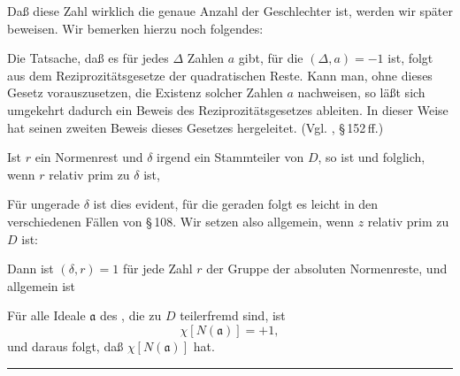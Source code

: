 Daß diese Zahl wirklich die genaue Anzahl der Geschlechter ist, werden wir später beweisen. Wir bemerken hierzu noch folgendes:

Die Tatsache, daß es für jedes $\Delta$ Zahlen $a$ gibt, für die $(\Delta, a) = -1$ ist, folgt aus dem Reziprozitätsgesetze der quadratischen Reste. Kann man, ohne dieses Gesetz vorauszusetzen, die Existenz solcher Zahlen $a$ nachweisen, so läßt sich umgekehrt dadurch ein Beweis des Reziprozitätsgesetzes ableiten. In dieser Weise hat  seinen zweiten Beweis dieses Gesetzes hergeleitet. (Vgl. , \S\,152\,ff.)

Ist $r$ ein Normenrest und $\delta$ irgend ein Stammteiler von $D$, so ist
und folglich, wenn $r$ relativ prim zu $\delta$ ist,

Für ungerade $\delta$ ist dies evident, für die geraden folgt es leicht in den verschiedenen Fällen von \S\,108. Wir setzen also allgemein, wenn $z$ relativ prim zu $D$ ist:

Dann ist $(\delta, r) = 1$ für jede Zahl $r$ der Gruppe der absoluten Normenreste, und allgemein ist

Für alle Ideale $\mathfrak{a}$ des , die zu $D$ teilerfremd sind, ist
\[
\chi[N(\mathfrak{a})] = +1,
\]
und daraus folgt, daß $\chi[N(\mathfrak{a})]$  hat.


\begin{center}\rule{0.32\linewidth}{0.4pt}\end{center}
